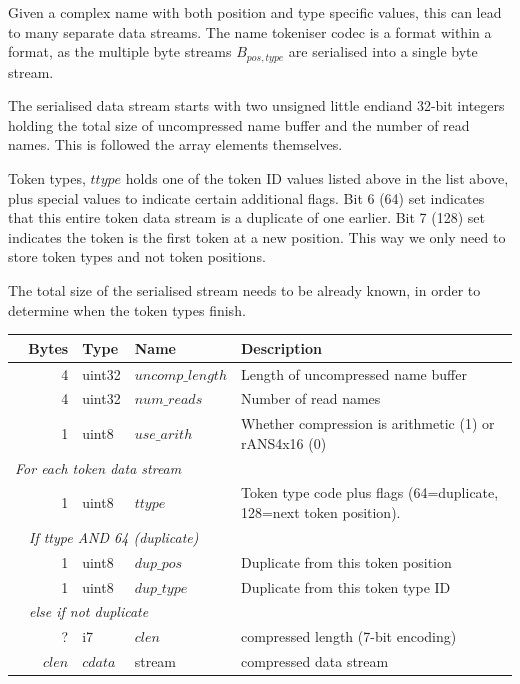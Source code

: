 \documentclass[a4paper]{article}
\begin{document}
Given a complex name with both position and type specific values, this
can lead to many separate data streams.  The name tokeniser codec is
a format within a format, as the multiple byte streams $B_{pos,type}$
are serialised into a single byte stream.

The serialised data stream starts with two unsigned little endiand 32-bit
integers holding the total size of uncompressed name buffer and the
number of read names.  This is followed the array elements
themselves.

Token types, $ttype$ holds one of the token ID values listed above
in the list above, plus special values to indicate certain additional
flags.  Bit 6 (64) set indicates that this entire token data stream is a
duplicate of one earlier.  Bit 7 (128) set indicates the token
is the first token at a new position.  This way we only need to store
token types and not token positions.

The total size of the serialised stream needs to be already known, in
order to determine when the token types finish.

\begin{tabular}{|r|r|r|l|l|p{10cm}|}
\hline
\multicolumn{3}{|r|}{\textbf{Bytes}} & \textbf{Type} & \textbf{Name} & \textbf{Description}\\
\hline
\multicolumn{3}{|r|}{4} & uint32 & $uncomp\_length$ & Length of uncompressed name buffer\\
\multicolumn{3}{|r|}{4} & uint32 & $num\_reads$ & Number of read names\\
\multicolumn{3}{|r|}{1} & uint8  & $use\_arith$ & Whether compression is arithmetic (1) or rANS4x16 (0)\\
\hline
\multicolumn{6}{|l|}{\quad\textit{For each token data stream}}\\
\cline{2-6}
& \multicolumn{2}{r|}{1} & uint8 & $ttype$ & Token type code plus flags (64=duplicate, 128=next token position).\\
\cline{2-6}
& \multicolumn{5}{l|}{\textit{If ttype AND 64 (duplicate)}}\\
\cline{3-6}
& & 1 & uint8 & $dup\_pos$  & Duplicate from this token position\\
& & 1 & uint8 & $dup\_type$ & Duplicate from this token type ID\\
\cline{3-6}
& \multicolumn{5}{l|}{\textit{else if not duplicate}}\\
\cline{3-6}
& & ? & i7 & $clen$ & compressed length (7-bit encoding)\\
& & $clen$ & $cdata$ & stream & compressed data stream\\
\hline
\end{tabular}
\end{document}
